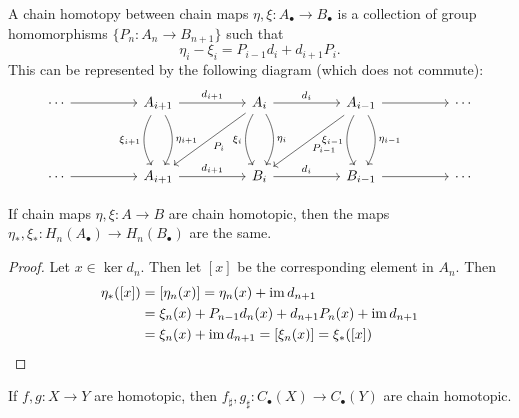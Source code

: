 \begin{defn}
  A chain homotopy between chain maps $\eta,\xi: A_\bullet \to B_\bullet$ is a collection of group homomorphisms $\{P_n: A_n \to B_{n+1}\}$ such that
  \[\eta_i-\xi_i = P_{i-1}d_i+d_{i+1}P_i.\]
  This can be represented by the following diagram (which does not commute):
  \begin{equation*}
    \begin{tikzcd}[column sep=huge, row sep=huge]
      \cdots \ar[r] & A_{i+1} \ar[r, "d_{i+1}"] \ar[d, "\eta_{i+1}", bend left] \ar[d, "\xi_{i+1}"', bend right] & A_i \ar[r, "d_i"] \ar[d, "\eta_i", bend left] \ar[d, "\xi_i"', bend right] \ar[ld, "P_i"] & A_{i-1} \ar[r] \ar[d, "\eta_{i-1}", bend left] \ar[d, "\xi_{i-1}"', bend right] \ar[ld, "P_{i-1}"] & \cdots \\
      \cdots \ar[r] & A_{i+1} \ar[r, "d_{i+1}"] & B_i \ar[r, "d_i"] & B_{i-1} \ar[r] & \cdots
    \end{tikzcd}
  \end{equation*}
\end{defn}

\begin{lem}
  If chain maps $\eta,\xi: A \to B$ are chain homotopic, then the maps $\eta_*,\xi_*: H_n(A_\bullet) \to H_n(B_\bullet)$ are the same.
\end{lem}

\begin{proof}
  Let $x \in \ker d_n$.
  Then let $[x]$ be the corresponding element in $A_n$.
  Then
  \begin{align*}
    \eta_*([x]) &= [\eta_n(x)] = \eta_n(x) + \operatorname{im} d_{n+1} \\
    &= \xi_n(x) + P_{n-1}d_n(x) + d_{n+1}P_n(x) + \operatorname{im} d_{n+1} \\
    &= \xi_n(x) + \operatorname{im} d_{n+1} = [\xi_n(x)] = \xi_*([x]) \qedhere
  \end{align*}
\end{proof}

\begin{lem}
  If $f, g: X \to Y$ are homotopic, then $f_\sharp,g_\sharp:C_\bullet(X) \to C_\bullet(Y)$ are chain homotopic.
\end{lem}

